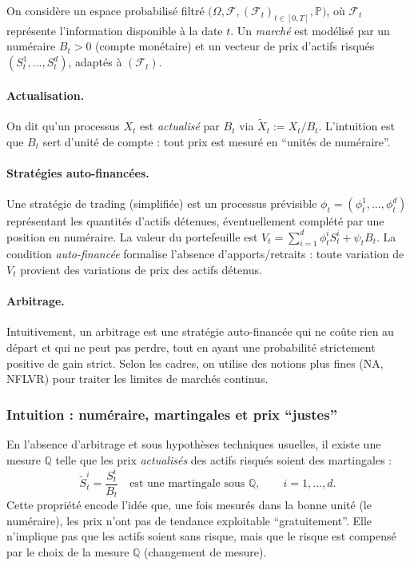 \documentclass[11pt,a4paper]{article}
\newcommand{\PP}{\mathbb{P}}
\newcommand{\QQ}{\mathbb{Q}}
\newcommand{\1}{\mathbf{1}}
\begin{document}
On consid\`ere un espace probabilis\'e filtr\'e $\bigl(\Omega,\mathcal{F},(\mathcal{F}_t)_{t\in[0,T]},\PP\bigr)$,
o\`u $\mathcal{F}_t$ repr\'esente l'information disponible \`a la date $t$.
Un \emph{march\'e} est mod\'elis\'e par un num\'eraire $B_t>0$ (compte mon\'etaire) et un vecteur de prix
d'actifs risqu\'es $(S_t^1,\dots,S_t^d)$, adapt\'es \`a $(\mathcal{F}_t)$.

\paragraph{Actualisation.}
On dit qu'un processus $X_t$ est \emph{actualis\'e} par $B_t$ via $\widetilde X_t:=X_t/B_t$.
L'intuition est que $B_t$ sert d'unit\'e de compte : tout prix est mesur\'e en ``unit\'es de num\'eraire''.

\paragraph{Strat\'egies auto-financ\'ees.}
Une strat\'egie de trading (simplifi\'ee) est un processus pr\'evisible $\phi_t=(\phi_t^1,\dots,\phi_t^d)$
repr\'esentant les quantit\'es d'actifs d\'etenues, \'eventuellement compl\'et\'e par une position en num\'eraire.
La valeur du portefeuille est $V_t=\sum_{i=1}^d \phi_t^i S_t^i + \psi_t B_t$.
La condition \emph{auto-financ\'ee} formalise l'absence d'apports/retraits : toute variation de $V_t$ provient
des variations de prix des actifs d\'etenus.

\paragraph{Arbitrage.}
Intuitivement, un arbitrage est une strat\'egie auto-financ\'ee qui ne co\^ute rien au d\'epart et qui ne peut
pas perdre, tout en ayant une probabilit\'e strictement positive de gain strict. Selon les cadres, on utilise
des notions plus fines (NA, NFLVR) pour traiter les limites de march\'es continus.

\subsubsection{Intuition : num\'eraire, martingales et prix ``justes''}

En l'absence d'arbitrage et sous hypoth\`eses techniques usuelles, il existe une mesure $\QQ$ telle que les
prix \emph{actualis\'es} des actifs risqu\'es soient des martingales :
\[
\widetilde S_t^i=\frac{S_t^i}{B_t}
\quad \text{est une martingale sous } \QQ,\qquad i=1,\dots,d.
\]
Cette propri\'et\'e encode l'id\'ee que, une fois mesur\'es dans la bonne unit\'e (le num\'eraire), les prix n'ont
pas de tendance exploitable ``gratuitement''. Elle n'implique pas que les actifs soient sans risque, mais que
le risque est compens\'e par le choix de la mesure $\QQ$ (changement de mesure).
\end{document}
